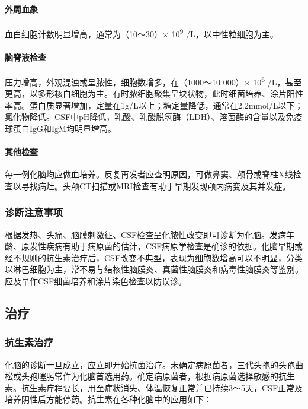 \paragraph{外周血象}

血白细胞计数明显增高，通常为（10～30）× 10\textsuperscript{9}
/L，以中性粒细胞为主。

\paragraph{脑脊液检查}

压力增高，外观混浊或呈脓性，细胞数增多，在（1000～10 000）×
10\textsuperscript{6}
/L，甚至更高，以多形核白细胞为主。有时脓细胞聚集呈块状物，此时细菌培养、涂片阳性率高。蛋白质显著增加，定量在1g/L以上；糖定量降低，通常在2.2mmol/L以下；氯化物降低。CSF中pH降低，乳酸、乳酸脱氢酶（LDH）、溶菌酶的含量以及免疫球蛋白IgG和IgM均明显增高。

\paragraph{其他检查}

每一例化脑均应做血培养。反复再发者应查明原因，可做鼻窦、颅骨或脊柱X线检查以寻找病灶。头颅CT扫描或MRI检查有助于早期发现颅内病变及其并发症。

\subsubsection{诊断注意事项}

根据发热、头痛、脑膜刺激征、CSF检查呈化脓性改变即可诊断为化脑。发病年龄、原发性疾病有助于病原菌的估计，CSF病原学检查是确诊的依据。化脑早期或经不规则的抗生素治疗后，CSF改变不典型，表现为细胞数增高可以不明显，分类以淋巴细胞为主，常不易与结核性脑膜炎、真菌性脑膜炎和病毒性脑膜炎等鉴别。应及早作CSF细菌培养和涂片染色检查以防误诊。

\subsection{治疗}

\subsubsection{抗生素治疗}

化脑的诊断一旦成立，应立即开始抗菌治疗。未确定病原菌者，三代头孢的头孢曲松或头孢噻肟常作为化脑首选用药。确定病原菌者，根据病原菌选择敏感的抗生素。抗生素疗程要长，用至症状消失、体温恢复正常并已持续3～5天，CSF正常及培养阴性后方能停药。抗生素在各种化脑中的应用如下：

